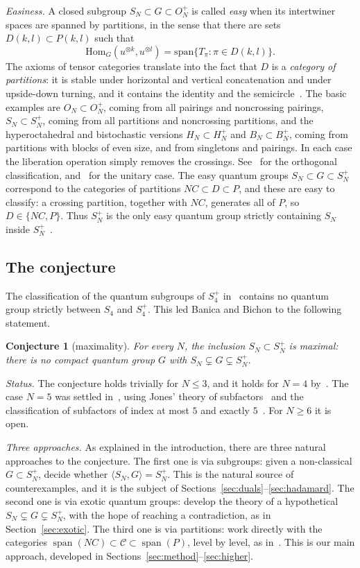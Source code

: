 \documentclass[11pt]{amsart}
\newtheorem{conjecture}[theorem]{Conjecture}
\theoremstyle{definition}
\theoremstyle{remark}
\theoremstyle{plain}
\numberwithin{equation}{section}
\numberwithin{table}{section}
\DeclareMathOperator{\spn}{span}
\begin{document}
\emph{Easiness.} A closed subgroup $S_N\subset G\subset O_N^+$ is called \emph{easy} when its intertwiner spaces are spanned by partitions, in the sense that there are sets $D(k,l)\subset P(k,l)$ such that
\[
\mathrm{Hom}_G(u^{\otimes k},u^{\otimes l})=\mathrm{span}\big\{T_\pi:\pi\in D(k,l)\big\}.
\]
The axioms of tensor categories translate into the fact that $D$ is a \emph{category of partitions}: it is stable under horizontal and vertical concatenation and under upside-down turning, and it contains the identity and the semicircle~\cite{bsp}. The basic examples are $O_N\subset O_N^+$, coming from all pairings and noncrossing pairings, $S_N\subset S_N^+$, coming from all partitions and noncrossing partitions, and the hyperoctahedral and bistochastic versions $H_N\subset H_N^+$ and $B_N\subset B_N^+$, coming from partitions with blocks of even size, and from singletons and pairings. In each case the liberation operation simply removes the crossings. See~\cite{bcs,rw} for the orthogonal classification, and~\cite{tw} for the unitary case. The easy quantum groups $S_N\subset G\subset S_N^+$ correspond to the categories of partitions $NC\subset D\subset P$, and these are easy to classify: a crossing partition, together with $NC$, generates all of $P$, so $D\in\{NC,P\}$. Thus $S_N^+$ is the only easy quantum group strictly containing $S_N$ inside $S_N^+$~\cite{bcs}.

\subsection{The conjecture}

The classification of the quantum subgroups of $S_4^+$ in~\cite{bb} contains no quantum group strictly between $S_4$ and $S_4^+$. This led Banica and Bichon to the following statement.

\begin{conjecture}[maximality]\label{conj:max}
For every $N$, the inclusion $S_N\subset S_N^+$ is maximal: there is no compact quantum group $G$ with $S_N\subsetneq G\subsetneq S_N^+$.
\end{conjecture}

\emph{Status.} The conjecture holds trivially for $N\le3$, and it holds for $N=4$ by~\cite{bb}. The case $N=5$ was settled in~\cite{bah}, using Jones' theory of subfactors~\cite{jo1} and the classification of subfactors of index at most $5$ and exactly $5$~\cite{imps,jms}. For $N\ge6$ it is open.

\emph{Three approaches.} As explained in the introduction, there are three natural approaches to the conjecture. The first one is via subgroups: given a non-classical $G\subset S_N^+$, decide whether $\langle S_N,G\rangle=S_N^+$. This is the natural source of counterexamples, and it is the subject of Sections~\ref{sec:duals}--\ref{sec:hadamard}. The second one is via exotic quantum groups: develop the theory of a hypothetical $S_N\subsetneq G\subsetneq S_N^+$, with the hope of reaching a contradiction, as in Section~\ref{sec:exotic}. The third one is via partitions: work directly with the categories $\spn(NC)\subset\mathcal C\subset\spn(P)$, level by level, as in~\cite{bah,mc2}. This is our main approach, developed in Sections~\ref{sec:method}--\ref{sec:higher}.
\end{document}
